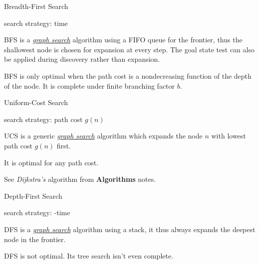\documentclass{cognito}
\begin{document}
\begin{note}{Breadth-First Search}
	\begin{mdframed}[linecolor=black!25!white]
		search strategy: time
	\end{mdframed}
	BFS is a \hyperref[note:Graph Search]{\emph{graph search}} algorithm using a FIFO queue for the frontier, thus the
	shallowest node is chosen for expansion at every step.
	The goal state test can also be applied during discovery rather than expansion.
	
	\begin{remark} BFS is only optimal when the path cost is a nondecreasing function
		of the depth of the node. It is complete under finite branching factor $b$.
	\end{remark}
	\vspace{-5pt}
\end{note}

\begin{note}{Uniform-Cost Search}
	\begin{mdframed}[linecolor=black!25!white]
		search strategy: path cost $g(n)$
	\end{mdframed}
	UCS is a generic \hyperref[note:Graph Search]{\emph{graph search}} algorithm which expands the node $n$ with lowest path cost $g(n)$ first.
	\begin{remark} It is optimal for any path cost. \end{remark}
	\begin{remark} See \emph{Dijkstra's} algorithm from \textbf{Algorithms} \noteref notes. \end{remark}
	\vspace{-5pt}
\end{note}

\begin{note}{Depth-First Search}
	\begin{mdframed}[linecolor=black!25!white]
		search strategy: -time
	\end{mdframed}
	DFS is a \hyperref[note:Graph Search]{\emph{graph search}} algorithm using a stack,
	it thus always expands the deepest node in the frontier. 
	\begin{remark} DFS is not optimal. Its tree search isn't even complete.
	\end{remark}
	\vspace{-5pt}
\end{note}
\end{document}
